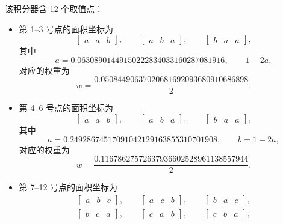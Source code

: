 该积分器含 12 个取值点：
\begin{itemize}[wide]
\item 第 1–3 号点的面积坐标为
\begin{equation}
\begin{bmatrix}a & a & b\end{bmatrix},\qquad\begin{bmatrix}a & b & a\end{bmatrix},\qquad\begin{bmatrix}b & a & a\end{bmatrix},
\end{equation}
其中
\begin{equation}
a=0.06308901449150222834033160287081916,\qquad1-2a,
\end{equation}
对应的权重为
\begin{equation}
w=\frac{0.05084490637020681692093680910686898}{2}.
\end{equation}
\item 第 4–6 号点的面积坐标为
\begin{equation}
\begin{bmatrix}a & a & b\end{bmatrix},\qquad\begin{bmatrix}a & b & a\end{bmatrix},\qquad\begin{bmatrix}b & a & a\end{bmatrix},
\end{equation}
其中
\begin{equation}
a=0.24928674517091042129163855310701908,\qquad b=1-2a,
\end{equation}
对应的权重为
\begin{equation}
w=\frac{0.11678627572637936602528961138557944}{2}.
\end{equation}
\item 第 7–12 号点的面积坐标为
\begin{equation}
\begin{gathered}\begin{bmatrix}a & b & c\end{bmatrix},\qquad\begin{bmatrix}a & c & b\end{bmatrix},\qquad\begin{bmatrix}b & a & c\end{bmatrix},\\
\begin{bmatrix}b & c & a\end{bmatrix},\qquad\begin{bmatrix}c & a & b\end{bmatrix},\qquad\begin{bmatrix}c & b & a\end{bmatrix},

\end{gathered}
\end{equation}
\end{itemize}
